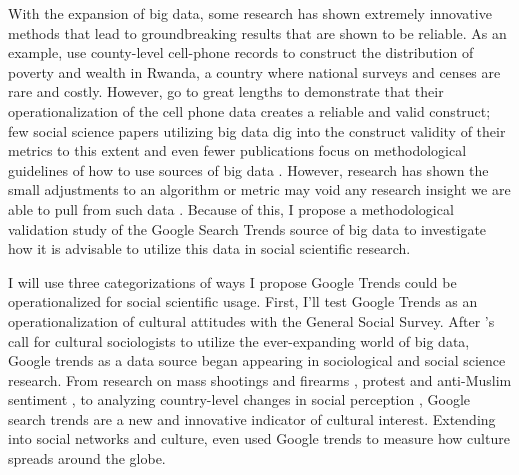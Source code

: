 With the expansion of big data, some research has shown extremely
innovative methods that lead to groundbreaking results that are shown to
be reliable. As an example, \citet{blumenstockPredictingPovertyWealth2015} use
county-level cell-phone records to construct the distribution of poverty
and wealth in Rwanda, a country where national surveys and censes are
rare and costly. However, \citet{blumenstockPredictingPovertyWealth2015} go to
great lengths to demonstrate that their operationalization of the cell
phone data creates a reliable and valid construct; few social science
papers utilizing big data dig into the construct validity of their
metrics to this extent and even fewer publications focus on
methodological guidelines of how to use sources of big data
\citep{asseoTrackingCOVID19Using2020, stilesAssessingCriterionValidity2018}.
However, research has shown the small adjustments to an algorithm or
metric may void any research insight we are able to pull from such data
\citep{lazerParableGoogleFlu2014}. Because of this, I propose a
methodological validation study of the Google Search Trends source of
big data to investigate how it is advisable to utilize this data in
social scientific research.

I will use three categorizations of ways I propose Google Trends could
be operationalized for social scientific usage. First, I'll test Google
Trends as an operationalization of cultural attitudes with the General
Social Survey. After \citet{bailCulturalEnvironmentMeasuring2014}'s call for
cultural sociologists to utilize the ever-expanding world of big data,
Google trends as a data source began appearing in sociological and
social science research. From research on mass shootings and firearms
\citep{brownsteinInternetSearchPatterns2020,semenzaInformationseekingWakeTragedy2020}, protest and anti-Muslim sentiment \citep{bailUsingInternetSearch2018,barrieSearchingRacismGeorge2020,grossThereFergusonEffect2017}, to analyzing country-level changes in social perception \citep{reyes_etal18},
Google search trends are a new and innovative indicator of cultural
interest. Extending into social networks and culture, \citet{bailPrestigeProximityPrejudice2019} even used Google trends to measure
how culture spreads around the globe.

